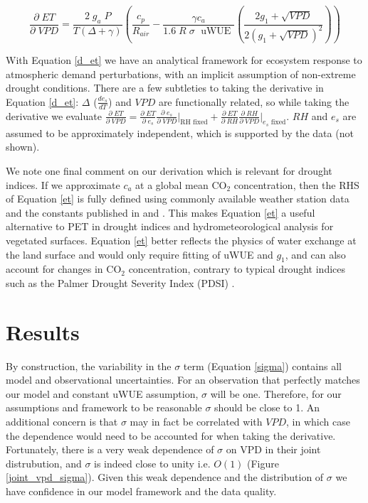 \documentclass[draft,linenumbers]{gcbjournal}
\begin{document}
\begin{linenomath*}
  \begin{equation}
    \frac{\partial \;  ET}{\partial \; VPD} = \frac{2\; g_a \; P}{T(\Delta + \gamma)}   \left(\frac{ c_p}{R_{air}} -  \frac{\gamma c_a }{1.6 \; R\; \sigma \; \text{ uWUE }} \left( \frac{2 g_1 + \sqrt{VPD}}{2 (g_1 + \sqrt{VPD})^2}\right) \right)
    \label{d_et}
  \end{equation}
\end{linenomath*}

With Equation \ref{d_et} we have an analytical framework for ecosystem response to atmospheric demand perturbations, with an implicit assumption of non-extreme drought conditions. There are a few subtleties to taking the derivative in Equation \ref{d_et}: $\Delta$ ($\frac{d e_{s}}{d T}$) and $VPD$ are functionally related, so while taking the derivative we evaluate $\frac{\partial \; ET}{\partial \; VPD} = \frac{\partial \; ET} {\partial \; e_s} \frac{\partial \; e_s}{\partial \; VPD} \Big|_{\text{RH fixed}} + \frac{\partial \; ET}{\partial \; RH} \frac{\partial \; RH}{\partial \; VPD} \Big|_{\text{$e_s$ fixed}}$. $RH$ and $e_s$ are assumed to be approximately independent, which is supported by the data (not shown). 

We note one final comment on our derivation which is relevant for drought indices. If we approximate $c_a$ at a global mean CO$_2$ concentration, then the RHS of Equation \ref{et} is fully defined using commonly available weather station data and the constants published in \citet{Zhou_2015} and \citet{Lin_2015}. This makes Equation \ref{et} a useful alternative to PET in drought indices and hydrometeorological analysis for vegetated surfaces. Equation \ref{et} better reflects the physics of water exchange at the land surface and would only require fitting of uWUE and $g_1$, and can also account for changes in CO$_2$ concentration, contrary to typical drought indices such as the Palmer Drought Severity Index (PDSI) \citep{Swann_2016}.




\section{Results}
\label{results}

By construction, the variability in the $\sigma$ term (Equation \ref{sigma}) contains all model and observational uncertainties. For an observation that perfectly matches our model and constant uWUE assumption, $\sigma$ will be one. Therefore, for our assumptions and framework to be reasonable $\sigma$ should be close to 1. An additional concern is that $\sigma$ may in fact be correlated with $VPD$, in which case the dependence would need to be accounted for when taking the derivative. Fortunately, there is a very weak dependence of $\sigma$ on VPD in their joint distrubution, and $\sigma$ is indeed close to unity i.e. $O(1)$ (Figure \ref{joint_vpd_sigma}). Given this weak dependence and the distribution of $\sigma$ we have confidence in our model framework and the data quality.
\end{document}
